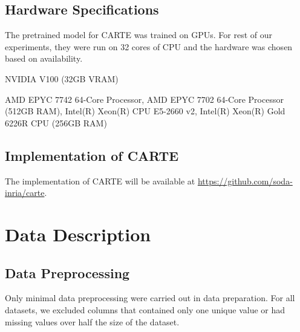 \documentclass{article}
\theoremstyle{plain}
\theoremstyle{definition}
\theoremstyle{remark}
\begin{document}
\subsection{Hardware Specifications}\label{app:hardware_specification}
The pretrained model for CARTE was trained on GPUs. For rest of our experiments, they were run on 32 cores of CPU and the hardware was chosen based on availability. 

\begin{description}[itemsep=1pt, leftmargin = 1.15cm]
    \item [\textbf{GPUs:}] NVIDIA V100 (32GB VRAM)
    \item [\textbf{CPUs:}] AMD EPYC 7742 64-Core Processor, AMD EPYC 7702 64-Core Processor (512GB RAM), Intel(R) Xeon(R) CPU E5-2660 v2, Intel(R) Xeon(R) Gold 6226R CPU (256GB RAM)
\end{description}

\subsection{Implementation of CARTE}
The implementation of CARTE will be available at \url{https://github.com/soda-inria/carte}.

\section{Data Description}\label{app:datasets}

\subsection{Data Preprocessing}
Only minimal data preprocessing were carried out in data preparation. For all datasets, we excluded columns that contained only one unique value or had missing values over half the size of the dataset.
\end{document}
